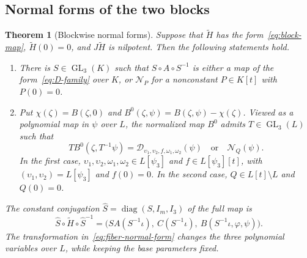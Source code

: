 \documentclass[11pt,reqno]{amsart}
\newtheorem{theorem}{Theorem}[section]
\theoremstyle{definition}
\theoremstyle{remark}
\numberwithin{equation}{section}
\DeclareMathOperator{\GL}{GL}
\DeclareMathOperator{\diag}{diag}
\newcommand{\Ncal}{\mathcal N}
\newcommand{\Dcal}{\mathcal D}
\begin{document}
\subsection{Normal forms of the two blocks}
\begin{theorem}[Blockwise normal forms]\label{thm2}
Suppose that $\widetilde H$ has the form~\eqref{eq:block-map}, $\widetilde H(0)=0$, and $J\widetilde H$ is nilpotent. Then the following statements hold.
\begin{enumerate}
\item There is $S\in\GL_3(K)$ such that $S\circ A\circ S^{-1}$ is either a map of the form~\eqref{eq:D-family} over $K$, or $\Ncal_P$ for a nonconstant $P\in K[t]$ with $P(0)=0$.
\item Put $\chi(\zeta)=B(\zeta,0)$ and $B^0(\zeta,\psi)=B(\zeta,\psi)-\chi(\zeta)$. Viewed as a polynomial map in $\psi$ over $L$, the normalized map $B^0$ admits $T\in\GL_3(L)$ such that
\begin{equation}\label{eq:fiber-normal-form}
 T B^0(\zeta,T^{-1}\psi)=\Dcal_{\upsilon_1,\upsilon_2,f,\omega_1,\omega_2}(\psi)
 \quad\text{or}\quad \Ncal_Q(\psi).
\end{equation}
In the first case, $\upsilon_1,\upsilon_2,\omega_1,\omega_2\in L[\psi_3]$ and $f\in L[\psi_3][t]$, with $(\upsilon_1,\upsilon_2)=L[\psi_3]$ and $f(0)=0$. In the second case, $Q\in L[t]\setminus L$ and $Q(0)=0$.
\end{enumerate}
The constant conjugation $\widehat S=\diag(S,I_m,I_3)$ of the full map is
\begin{equation}\label{eq:whole-base-conjugation}
 \widehat S\circ\widetilde H\circ\widehat S^{-1}
 =\bigl(SA(S^{-1}\iota),\ C(S^{-1}\iota),\ B(S^{-1}\iota,\varphi,\psi)\bigr).
\end{equation}
The transformation in~\eqref{eq:fiber-normal-form} changes the three polynomial variables over $L$, while keeping the base parameters fixed.
\end{theorem}
\end{document}
